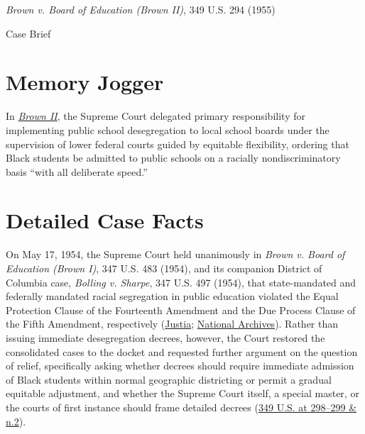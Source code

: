 \documentclass[12pt]{article}
\begin{document}
\begin{center}
{\LARGE \textit{Brown v. Board of Education (Brown II)}, 349 U.S. 294 (1955)\par}
\vspace{0.8em}
{\large Case Brief\par}
\end{center}
\vspace{1em}

\section{Memory Jogger}

In \href{https://www.courtlistener.com/opinion/105312/brown-v-board-of-education/}{\textit{Brown II}}, the Supreme Court delegated primary responsibility for implementing public school desegregation to local school boards under the supervision of lower federal courts guided by equitable flexibility, ordering that Black students be admitted to public schools on a racially nondiscriminatory basis ``with all deliberate speed.''

\section{Detailed Case Facts}

On May 17, 1954, the Supreme Court held unanimously in \textit{Brown v. Board of Education (Brown I)}, 347 U.S. 483 (1954), and its companion District of Columbia case, \textit{Bolling v. Sharpe}, 347 U.S. 497 (1954), that state-mandated and federally mandated racial segregation in public education violated the Equal Protection Clause of the Fourteenth Amendment and the Due Process Clause of the Fifth Amendment, respectively (\href{https://supreme.justia.com/cases/federal/us/349/294/}{Justia}; \href{https://www.archives.gov/education/lessons/brown-v-board}{National Archives}). Rather than issuing immediate desegregation decrees, however, the Court restored the consolidated cases to the docket and requested further argument on the question of relief, specifically asking whether decrees should require immediate admission of Black students within normal geographic districting or permit a gradual equitable adjustment, and whether the Supreme Court itself, a special master, or the courts of first instance should frame detailed decrees (\href{https://supreme.justia.com/cases/federal/us/349/294/}{349 U.S. at 298--299 \& n.2}).
\end{document}
